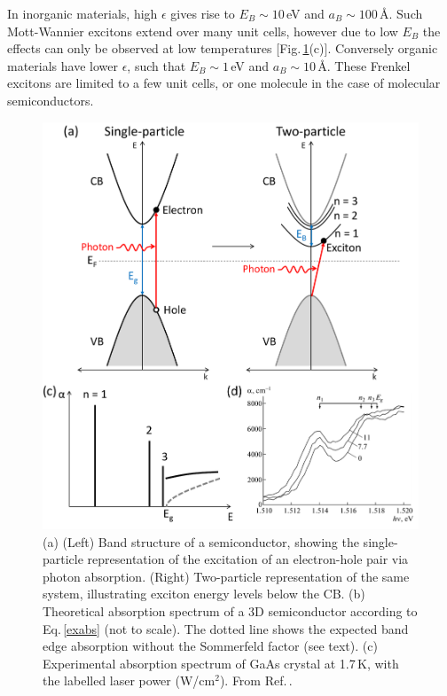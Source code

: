 In inorganic materials, high $\epsilon$ gives rise to $E_B \sim 10$\,eV and $a_B \sim 100$\,\AA. Such Mott-Wannier excitons extend over many unit cells, however due to low $E_B$ the effects can only be observed at low temperatures [Fig.\,\ref{2Fig1}(c)]. Conversely organic materials have lower $\epsilon$, such that $E_B \sim 1$\,eV and $a_B \sim 10$\,\AA. These Frenkel excitons are limited to a few unit cells, or one molecule in the case of molecular semiconductors.
\begin{figure}[h!] 
\centering    
\includegraphics[width=\textwidth]{Fig1}
\caption{(a) (Left) Band structure of a semiconductor, showing the single-particle representation of the excitation of an electron-hole pair via photon absorption. (Right) Two-particle representation of the same system, illustrating exciton energy levels below the CB. (b) Theoretical absorption spectrum of a 3D semiconductor according to Eq.\,\ref{exabs} (not to scale). The dotted line shows the expected band edge absorption without the Sommerfeld factor (see text). (c) Experimental absorption spectrum of GaAs crystal at 1.7\,K, with the labelled laser power (W/cm$^2$). From Ref.\,\cite{Vaganov2013}.}
\label{2Fig1}
\end{figure}

